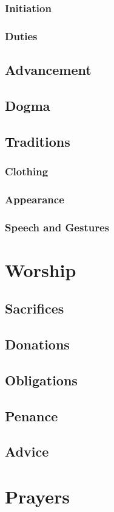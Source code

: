 \subsubsection{Initiation}
\subsubsection{Duties}
\subsection{Advancement}
\subsection{Dogma}
\subsection{Traditions}
\subsubsection{Clothing}
\subsubsection{Appearance}
\subsubsection{Speech and Gestures}
\section{Worship}
\subsection{Sacrifices}
\subsection{Donations}
\subsection{Obligations}
\subsection{Penance}
\subsection{Advice}
\section{Prayers}
